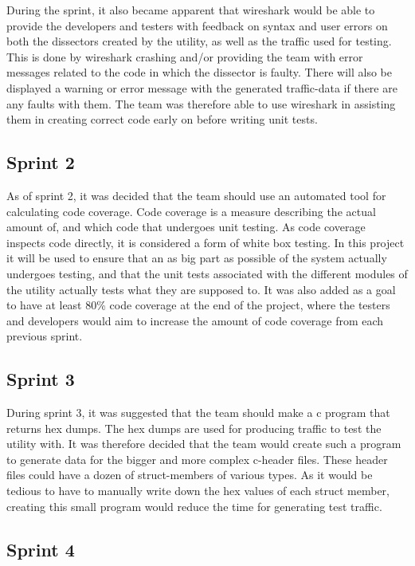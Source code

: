During the sprint, it also became apparent that \Gls{wireshark} would be able to provide the developers and testers with feedback on syntax and user errors on both the \glspl{dissector} created by the \gls{utility}, as well as the traffic used for testing. This is done by \Gls{wireshark} crashing and/or providing the team with error messages related to the code in which the \gls{dissector} is faulty. There will also be displayed a warning or error message with the generated traffic-data if there are any faults with them. The team was therefore able to use \Gls{wireshark} in assisting them in creating correct code early on before writing unit tests.   

\subsection{Sprint 2}
As of sprint 2, it was decided that the team should use an automated tool for calculating code coverage. Code coverage is a measure describing the actual amount of, and which code that undergoes unit testing. As code coverage inspects code directly, it is considered a form of white box testing. In this project it will be used to ensure that an as big part as possible of the system actually undergoes testing, and that the unit tests associated with the different modules of the \gls{utility} actually tests what they are supposed to. It was also added as a goal to have at least 80\% code coverage at the end of the project, where the testers and developers would aim to increase the amount of code coverage from each previous sprint.

\subsection{Sprint 3}
During sprint 3, it was suggested that the team should make a \Gls{c} program that returns \glspl{hex dump}. The \glspl{hex dump} are used for producing traffic to test the \gls{utility} with. It was therefore decided that the team would create such a program to generate data for the bigger and more complex \Gls{c}-\gls{header} files.
These \gls{header} files could have a dozen of \gls{struct}-\glspl{member} of various types. As it would be tedious to have to manually write down the hex values of each \gls{struct} \gls{member}, creating this small program would reduce the time for generating test traffic.

\subsection{Sprint 4}

